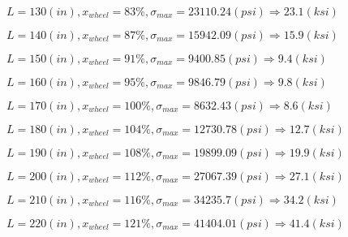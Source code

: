 \documentclass[11pt]{article}
\newcommand{\prompt}[4]{
        {\ttfamily\llap{{\color{#2}[#3]:\hspace{3pt}#4}}\vspace{-\baselineskip}}
    }
\begin{document}
            
\prompt{Out}{outcolor}{12}{}
    
    $L= 130(in), x_{wheel}=83 \%, \sigma_{max}=23110.24(psi) \Rightarrow 23.1(ksi)$

    
 
            
\prompt{Out}{outcolor}{12}{}
    
    $L= 140(in), x_{wheel}=87 \%, \sigma_{max}=15942.09(psi) \Rightarrow 15.9(ksi)$

    
 
            
\prompt{Out}{outcolor}{12}{}
    
    $L= 150(in), x_{wheel}=91 \%, \sigma_{max}=9400.85(psi) \Rightarrow 9.4(ksi)$

    
 
            
\prompt{Out}{outcolor}{12}{}
    
    $L= 160(in), x_{wheel}=95 \%, \sigma_{max}=9846.79(psi) \Rightarrow 9.8(ksi)$

    
 
            
\prompt{Out}{outcolor}{12}{}
    
    $L= 170(in), x_{wheel}=100 \%, \sigma_{max}=8632.43(psi) \Rightarrow 8.6(ksi)$

    
 
            
\prompt{Out}{outcolor}{12}{}
    
    $L= 180(in), x_{wheel}=104 \%, \sigma_{max}=12730.78(psi) \Rightarrow 12.7(ksi)$

    
 
            
\prompt{Out}{outcolor}{12}{}
    
    $L= 190(in), x_{wheel}=108 \%, \sigma_{max}=19899.09(psi) \Rightarrow 19.9(ksi)$

    
 
            
\prompt{Out}{outcolor}{12}{}
    
    $L= 200(in), x_{wheel}=112 \%, \sigma_{max}=27067.39(psi) \Rightarrow 27.1(ksi)$

    
 
            
\prompt{Out}{outcolor}{12}{}
    
    $L= 210(in), x_{wheel}=116 \%, \sigma_{max}=34235.7(psi) \Rightarrow 34.2(ksi)$

    
 
            
\prompt{Out}{outcolor}{12}{}
    
    $L= 220(in), x_{wheel}=121 \%, \sigma_{max}=41404.01(psi) \Rightarrow 41.4(ksi)$

    
 
            
\prompt{Out}{outcolor}{12}{}
    
\end{document}
